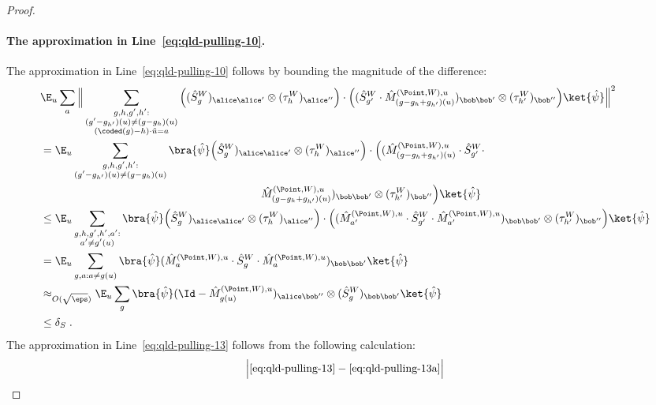 \begin{proof}
		\paragraph{The approximation in Line~\eqref{eq:qld-pulling-10}.} The approximation in Line~\eqref{eq:qld-pulling-10} follows by bounding the magnitude of the difference:	
\begin{align}
		&\E_u \sum_a \Big \| \sum_{\substack{g,h,g',h': \\ (g' - g_{h'})(u) \neq (g -g_h)(u) \\ (\coded(g)-h)\cdot \tilde{u} = a}} \Big((\hat{S}^W_g)_{\alice \alice'} \otimes (\tau_h^W)_{\alice''} \Big) \cdot \Big( (\hat{S}^W_{g'} \cdot \hat{M}^{(\Point,W),u}_{(g-g_h+g_{h'})(u)})_{\bob \bob'} \otimes (\tau_{h'}^W)_{\bob''} \Big) \ket{\hat{\psi}} \Big \|^2 \notag \\
&= \E_u \sum_{\substack{g,h,g',h': \\ (g' - g_{h'})(u) \neq (g -g_h)(u)}} \bra{\hat{\psi}} \Big(\hat{S}^W_g)_{\alice \alice'} \otimes (\tau_h^W)_{\alice''} \Big) \cdot \Big( (\hat{M}^{(\Point,W),u}_{(g-g_h+g_{h'})(u)} \cdot \hat{S}^W_{g'} \cdot \notag\\
      &\hspace{20em}\hat{M}^{(\Point,W),u}_{(g-g_h+g_{h'})(u)})_{\bob \bob'} \otimes (\tau_{h'}^W)_{\bob''} \Big) \ket{\hat{\psi}} \notag \\
		&\leq \E_u \sum_{\substack{g,h,g',h',a': \\ a' \neq g'(u)}} \bra{\hat{\psi}} \Big(\hat{S}^W_g)_{\alice \alice'} \otimes (\tau_h^W)_{\alice''} \Big) \cdot \Big( (\hat{M}^{(\Point,W),u}_{a'} \cdot \hat{S}^W_{g'} \cdot \hat{M}^{(\Point,W),u}_{a'})_{\bob \bob'} \otimes (\tau_{h'}^W)_{\bob''} \Big) \ket{\hat{\psi}} \notag \\
		&= \E_u \sum_{g,a: a \neq g(u)} \bra{\hat{\psi}} (\hat{M}^{(\Point,W),u}_{a} \cdot \hat{S}^W_{g} \cdot \hat{M}^{(\Point,W),u}_{a})_{\bob \bob'} \ket{\hat{\psi}} \label{eq:qld-pulling-13a} \\
		&\approx_{O(\sqrt{\eps})} \E_u \sum_{g} \bra{\hat{\psi}} (\Id - \hat{M}^{(\Point,W),u}_{g(u)})_{\alice \bob''} \otimes ( \hat{S}^W_{g})_{\bob \bob'} \ket{\hat{\psi}}  \label{eq:qld-pulling-13} \\
		&\leq \delta_S \;. \label{eq:qld-pulling-14}
\end{align}
The approximation in Line~\eqref{eq:qld-pulling-13} follows from the following calculation:
\begin{align}
	&\Big | \text{\eqref{eq:qld-pulling-13}} - \text{\eqref{eq:qld-pulling-13a}} \Big | \notag \\

\end{align}
\end{proof}
